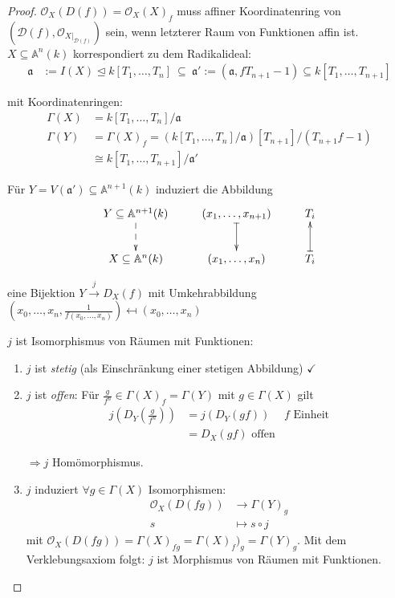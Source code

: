\begin{proof}
  $\mathcal{O}_{X}(D(f))=\mathcal{O}_{X}(X)_{f}$ muss affiner
  Koordinatenring von $(\mathcal{D}(f),\mathcal{O}_{X|_{\mathcal{D}(f)}})$
  sein, wenn letzterer Raum von Funktionen affin ist. $X\subseteq\mathbb{A}^{n}(k)$
  korrespondiert zu dem Radikalideal:
  \begin{align*}
    \mathfrak{a} & :=I(X)\unlhd k[T_1, \ldots, T_n]\ \subseteq\ \mathfrak{a}':=(\mathfrak{a},fT_{n+1}-1)\subseteq k[T_{1},\ldots,T_{n+1}]
  \end{align*}

  mit Koordinatenringen:
  \begin{align*}
    \Gamma(X) & =k[T_{1},\ldots,T_{n}]/\mathfrak{a}\\
    \Gamma(Y) & =\Gamma(X)_{f}=(k[T_{1},\ldots,T_{n}]/\mathfrak{a})[T_{n+1}]/(T_{n+1}f-1)\\
              & \cong k[T_{1},\ldots,T_{n+1}]/\mathfrak{a}'
  \end{align*}

  Für $Y=V(\mathfrak{a}')\subseteq\mathbb{A}^{n+1}(k)$ induziert die
  Abbildung
  \[
    \xymatrix{Y\subseteq\mathbb{A}^{n+1}(k)\ar@{-->}[d] & (x_{1},\ldots,x_{n+1})\ar@{|->}[d] & T_{i}\\
      X\subseteq\mathbb{A}^{n}(k) & (x_{1},\ldots,x_{n}) & T_{i}\ar@{|->}[u]
    }
  \]

  eine Bijektion $Y\xrightarrow{j} D_{X}(f)$  mit Umkehrabbildung
  $(x_{0},\ldots,x_{n},\frac{1}{f(x_{0},\ldots,x_{n})})\mapsfrom(x_{0},\ldots,x_{n})$
  \begin{claim*}
    $j$ ist Isomorphismus von Räumen mit Funktionen:
    \begin{enumerate}
    \item $j$ ist \emph{stetig} (als Einschränkung einer stetigen Abbildung) $\checkmark$
    \item $j$ ist \emph{offen}: Für $\frac{g}{f^{n}}\in\Gamma(X)_{f} = \Gamma(Y)$ mit $g\in\Gamma(X)$ gilt
      \begin{align*}
        j\left(D_{Y}\left(\frac{g}{f^{n}}\right)\right) & =j\left(D_{Y}(gf)\right) & f\text{ Einheit}\\
                                                        & =D_{X}(gf)\text{ offen}
      \end{align*}

      $\Rightarrow j$ Homömorphismus.
    \item $j$ induziert $\forall g\in\Gamma(X)$ Isomorphismen:
      \begin{align*}
        \mathcal{O}_{X}(D(fg)) & \longrightarrow\Gamma(Y)_{g}\\
        s & \longmapsto s\circ j
      \end{align*}
      mit $\mathcal{O}_{X}(D(fg))=\Gamma(X)_{fg}=\Gamma(X)_{f})_{g}=\Gamma(Y)_{g}$.
      Mit dem Verklebungsaxiom folgt: $j$ ist Morphismus von Räumen mit Funktionen.
    \end{enumerate}
  \end{claim*}
\end{proof}

